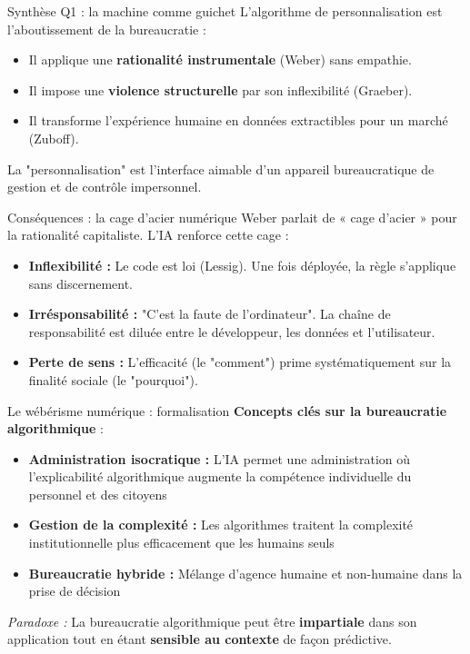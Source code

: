 \documentclass[9pt, aspectratio=169]{beamer}
\begin{document}
\begin{frame}{Synthèse Q1 : la machine comme guichet}
    L'algorithme de personnalisation est l'aboutissement de la bureaucratie :
    \begin{itemize}
        \item Il applique une \textbf{rationalité instrumentale} (Weber) sans empathie.
        \item Il impose une \textbf{violence structurelle} par son inflexibilité (Graeber).
        \item Il transforme l'expérience humaine en données extractibles pour un marché (Zuboff).
    \end{itemize}
    \vspace{0.3cm}
    La "personnalisation" est l'interface aimable d'un appareil bureaucratique de gestion et de contrôle impersonnel.
\end{frame}

\begin{frame}{Conséquences : la cage d'acier numérique}
    Weber parlait de « cage d'acier » pour la rationalité capitaliste. L'IA renforce cette cage :
    \begin{itemize}
        \item \textbf{Inflexibilité :} Le code est loi (Lessig). Une fois déployée, la règle s'applique sans discernement.
        \item \textbf{Irrésponsabilité :} "C'est la faute de l'ordinateur". La chaîne de responsabilité est diluée entre le développeur, les données et l'utilisateur.
        \item \textbf{Perte de sens :} L'efficacité (le "comment") prime systématiquement sur la finalité sociale (le "pourquoi").
    \end{itemize}
\end{frame}

\begin{frame}{Le wébérisme numérique : formalisation}
    \textbf{Concepts clés sur la bureaucratie algorithmique} :
    
    \vspace{0.3cm}
    \begin{itemize}
        \item \textbf{Administration isocratique :} L'IA permet une administration où l'explicabilité algorithmique augmente la compétence individuelle du personnel et des citoyens
        \item \textbf{Gestion de la complexité :} Les algorithmes traitent la complexité institutionnelle plus efficacement que les humains seuls
        \item \textbf{Bureaucratie hybride :} Mélange d'agence humaine et non-humaine dans la prise de décision
    \end{itemize}
    
    \vspace{0.3cm}
    \textit{Paradoxe :} La bureaucratie algorithmique peut être \textbf{impartiale} dans son application tout en étant \textbf{sensible au contexte} de façon prédictive.
\end{frame}
\end{document}
